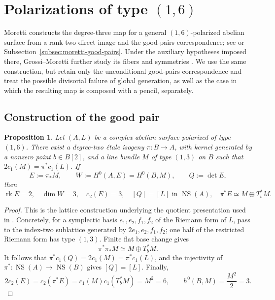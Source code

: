 \documentclass[12pt]{amsart}
\numberwithin{equation}{section}
\newtheorem{proposition}[theorem]{Proposition}
\theoremstyle{definition}
\theoremstyle{remark}
\begin{document}
\section{Polarizations of type \texorpdfstring{$(1,6)$}{(1,6)}}
\label{sec:16}

Moretti constructs the degree-three map for a general
$(1,6)$-polarized abelian surface from a rank-two direct image and the
good-pairs correspondence; see \cite[Proposition~1.5 and \S3]{Moretti} or Subsection~\ref{subsec:moretti-good-pairs}.
Under the auxiliary hypotheses imposed there, Grossi--Moretti further
study its fibers and symmetries
\cite[Theorems~2.1--2.2]{GrossiMoretti}.  We use the same construction,
but retain only the unconditional good-pairs
correspondence and treat the possible divisorial failure of global
generation, as well as the case in which the resulting map is composed
with a pencil, separately.

\subsection{Construction of the good pair}

\begin{proposition}\label{prop:16-cover}
Let $(A,L)$ be a complex abelian surface polarized of type $(1,6)$.
There exist a degree-two \emph{\'etale} isogeny
$\pi:B\to A$, with kernel generated by a nonzero point $b\in B[2]$,
and a line bundle $M$ of type $(1,3)$ on $B$ such that
$2c_1(M)=\pi^*c_1(L)$.  If
\[
 E:=\pi_*M,\qquad W:=H^0(A,E)=H^0(B,M),\qquad Q:=\det E,
\]
then
\[
 \operatorname{rk}E=2,\quad \dim W=3,\quad c_2(E)=3,
 \quad [Q]=[L]\text{ in }\operatorname{NS}(A),
 \quad \pi^*E\simeq M\oplus T_b^*M.
\]
\end{proposition}

\begin{proof}
This is the lattice construction underlying the quotient presentation
used in \cite[\S3, first paragraph]{Moretti}.  Concretely, for a symplectic
basis $e_1,e_2,f_1,f_2$ of the Riemann form of $L$, pass to the
index-two sublattice generated by $2e_1,e_2,f_1,f_2$; one half of the
restricted Riemann form has type $(1,3)$.  Finite flat base change gives
\[
 \pi^*\pi_*M\simeq M\oplus T_b^*M.
\]
It follows that $\pi^*c_1(Q)=2c_1(M)=\pi^*c_1(L)$, and the injectivity
of $\pi^*:\operatorname{NS}(A)\to\operatorname{NS}(B)$ gives
$[Q]=[L]$.  Finally,
\[
 2c_2(E)=c_2(\pi^*E)=c_1(M)c_1(T_b^*M)=M^2=6,
 \qquad h^0(B,M)=\frac{M^2}{2}=3.
\]
\end{proof}
\end{document}
